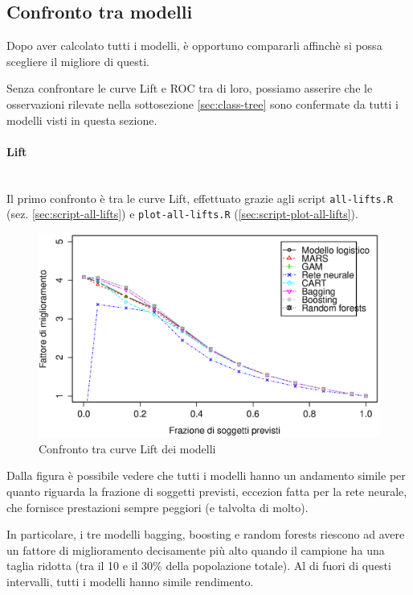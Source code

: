
\subsection{Confronto tra modelli}\label{sec:class-comparing}

Dopo aver calcolato tutti i modelli, è opportuno compararli affinchè si possa
scegliere il migliore di questi.

Senza confrontare le curve Lift e ROC tra di loro, possiamo asserire che le
osservazioni rilevate nella sottosezione \ref{sec:class-tree} sono confermate
da tutti i modelli visti in questa sezione.

\paragraph{Lift} \mbox{} \\

Il primo confronto è tra le curve Lift, effettuato grazie agli script
\texttt{all-lifts.R} (sez. \ref{sec:script-all-lifts}) e
\texttt{plot-all-lifts.R} (\ref{sec:script-plot-all-lifts}).

\begin{figure}[H]
  \centering
  \includegraphics[width=.5\columnwidth]{images/class/all-lifts.eps}
  \caption{Confronto tra curve Lift dei modelli}
  \label{fig:all-lifts}
\end{figure}

Dalla figura è possibile vedere che tutti i modelli hanno un andamento simile
per quanto riguarda la frazione di soggetti previsti, eccezion fatta per la
rete neurale, che fornisce prestazioni sempre peggiori (e talvolta di molto).

In particolare, i tre modelli bagging, boosting e random forests riescono ad
avere un fattore di miglioramento decisamente più alto quando il campione ha
una taglia ridotta (tra il 10 e il 30\% della popolazione totale). Al di fuori
di questi intervalli, tutti i modelli hanno simile rendimento.

